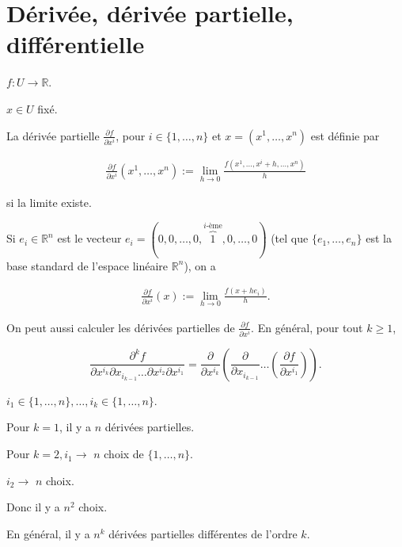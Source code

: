 \documentclass[french]{article}
\theoremstyle{definition}
\begin{document}
\section{Dérivée, dérivée partielle, différentielle}

$ f : U \to \mathbb{R}$.

$x \in U$ fixé.

La dérivée partielle $\frac{\partial f }{\partial x^i} $, pour $ i \in \{ 1, \dots, n \} $ et $x = (x^1, \dots, x^n)$ est définie par

\begin{gather*}
  \frac{\partial f }{\partial x^i} (x^1, \dots, x^n) := \lim_{h \to 0} \frac{f(x^1, \dots, x^i + h, \dots, x^n)}{h}
\end{gather*}

si la limite existe.

Si $e_i \in \mathbb{R}^n$ est le vecteur $e_i = (0,0,  \dots, 0, \overbrace{1}^{i\text{-ème}}, 0, \dots, 0)$ (tel que $\{ e_1, \dots, e_n \} $ est la base standard de l'espace linéaire $\mathbb{R}^n$), on a

\begin{gather*}
  \frac{\partial f }{\partial x^i }(x) := \lim_{h \to 0} \frac{f(x+h e_i)}{h}  .
\end{gather*}

On peut aussi calculer les dérivées partielles de $\frac{\partial f }{\partial x^i} $. En général, pour tout $k \geq 1$,

\[\frac{\partial ^{k} f }{\partial x^{i_k} \partial x _{i_{k-1}} \dots \partial x^{i_2} \partial x^{i_1}}  = \frac{\partial  }{\partial x^{i_k}} \left(\frac{\partial  }{\partial x _{i_{k-1}}} \dots \left(\frac{\partial f }{\partial x^{i_1}} \right) \right) .\]



$i_1 \in \{ 1, \dots, n \}, \dots, i_k \in \{ 1, \dots, n \} $.

Pour $k=1$, il y a $n$ dérivées partielles.

Pour $k=2, i_1 \longrightarrow$ $n$ choix de $\{ 1, \dots, n \} $.

$i_2 \longrightarrow $ $n$ choix.

Donc il y a $n ^2$ choix.

En général, il y a $n ^{k}$ dérivées partielles différentes de l'ordre $k$.
\end{document}
